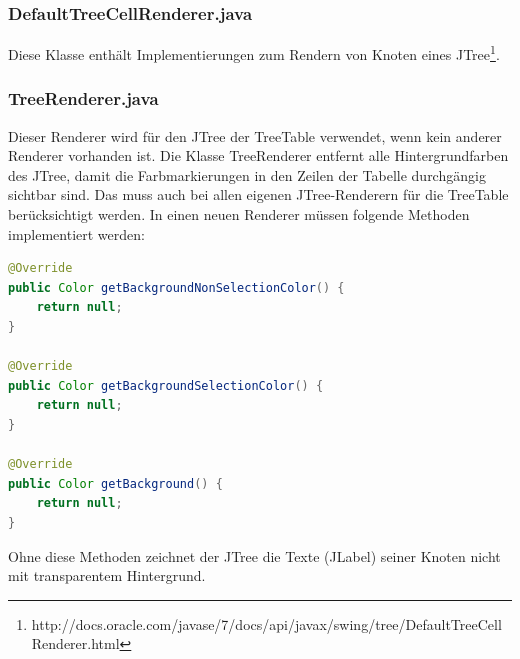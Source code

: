 \subsubsection*{DefaultTreeCellRenderer.java}
Diese Klasse enthält Implementierungen zum Rendern von Knoten eines JTree\footnote{http://docs.oracle.com/javase/7/docs/api/javax/swing/tree/DefaultTreeCellRenderer.html}.

\subsubsection*{TreeRenderer.java}
Dieser Renderer wird für den JTree der TreeTable verwendet, wenn kein anderer Renderer vorhanden ist. Die Klasse TreeRenderer entfernt alle Hintergrundfarben des JTree, damit die Farbmarkierungen in den Zeilen der Tabelle durchgängig sichtbar sind. Das muss auch bei allen eigenen JTree-Renderern für die TreeTable berücksichtigt werden. In einen neuen Renderer müssen folgende Methoden implementiert werden:
\begin{lstlisting}[language=JAVA]
@Override
public Color getBackgroundNonSelectionColor() {
    return null;
}

@Override
public Color getBackgroundSelectionColor() {
    return null;
}

@Override
public Color getBackground() {
    return null;
}
\end{lstlisting}

Ohne diese Methoden zeichnet der JTree die Texte (JLabel) seiner Knoten nicht mit transparentem Hintergrund.

